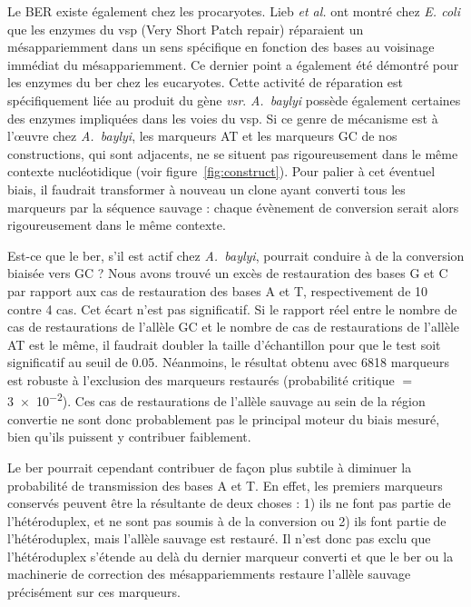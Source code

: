 Le BER existe également chez les procaryotes. Lieb \emph{et
  al.}\cite{lieb_recombination_1985} ont montré chez \emph{E. coli} que les
enzymes du \ac{vsp} (Very Short Patch repair) réparaient un mésappariemment
dans un sens spécifique en fonction des bases au voisinage immédiat du
mésappariemment. Ce dernier point a également été démontré pour les enzymes du
\ac{ber} chez les eucaryotes\cite{brown_different_1988}. Cette activité de
réparation est spécifiquement liée au produit du gène
\emph{vsr}\cite{hennecke_vsr_1991,lieb_specific_1983}. \emph{A.~baylyi} possède
également certaines des enzymes impliquées dans les voies du
\ac{vsp}\cite{kanehisa_kegg_2016}. Si ce genre de mécanisme est à l'œuvre chez
\emph{A.~baylyi}, les marqueurs AT et les marqueurs GC de nos constructions, qui
sont adjacents, ne se situent pas rigoureusement dans le même contexte
nucléotidique (voir figure~\ref{fig:construct}). Pour palier à cet éventuel
biais, il faudrait transformer à nouveau un clone ayant converti tous les
marqueurs par la séquence sauvage : chaque évènement de conversion serait alors
rigoureusement dans le même contexte.


Est-ce que le \ac{ber}, s'il est actif chez \emph{A.~baylyi}, pourrait conduire
à de la conversion biaisée vers GC ? Nous avons trouvé un excès de restauration
des bases G et C par rapport aux cas de restauration des bases A et T,
respectivement de 10 contre 4 cas. Cet écart n'est pas significatif. Si le
rapport réel entre le nombre de cas de restaurations de l'allèle GC et le nombre
de cas de restaurations de l'allèle AT est le même, il faudrait doubler la
taille d'échantillon pour que le test soit significatif au seuil de \num{0.05}.
Néanmoins, le résultat obtenu avec \num{6818} marqueurs est robuste à
l'exclusion des marqueurs restaurés (probabilité critique \(=\) \num{3e-2}). Ces
cas de restaurations de l'allèle sauvage au sein de la région convertie ne sont
donc probablement pas le principal moteur du biais mesuré, bien qu'ils puissent
y contribuer faiblement.

Le \ac{ber} pourrait cependant contribuer de façon plus subtile à diminuer la
probabilité de transmission des bases A et T. En effet, les premiers marqueurs
conservés peuvent être la résultante de deux choses : 1) ils ne font pas partie
de l'hétéroduplex, et ne sont pas soumis à de la conversion ou 2) ils font
partie de l'hétéroduplex, mais l'allèle sauvage est restauré. Il n'est donc pas
exclu que l'hétéroduplex s'étende au delà du dernier marqueur converti et que le
\ac{ber} ou la machinerie de correction des mésappariemments restaure l'allèle
sauvage précisément sur ces marqueurs.

